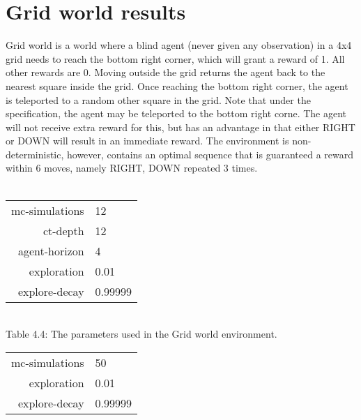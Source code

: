 \documentclass[pdftex,twoside,a4paper]{report}
\begin{document}
\section{Grid world results}
Grid world is a world where a blind agent (never given any observation) in a 4x4 grid needs to reach the bottom right corner, which will grant a reward of 1. All other rewards are 0. Moving outside the grid returns the agent back to the nearest square inside the grid. Once reaching the bottom right corner, the agent is teleported to a random other square in the grid. Note that under the specification, the agent may be teleported to the bottom right corne. The agent will not receive extra reward for this, but has an advantage in that either RIGHT or DOWN will result in an immediate reward. The environment is non-deterministic, however, contains an optimal sequence that is guaranteed a reward within 6 moves, namely RIGHT, DOWN repeated 3 times.\\\\
\begin{center}
\begin{tabular}{| r | l | }
\hline
mc-simulations & 12\\
ct-depth & 12\\
agent-horizon & 4\\
exploration & 0.01\\
explore-decay & 0.99999\\
\hline
\end{tabular}\\
\vspace{0.5mm}
Table 4.4: The parameters used in the Grid world environment.
\end{center}

\begin{tabular}{| r | l | }
\hline
mc-simulations & 50\\
exploration & 0.01\\
explore-decay & 0.99999\\
\hline
\end{tabular}

\end{document}
